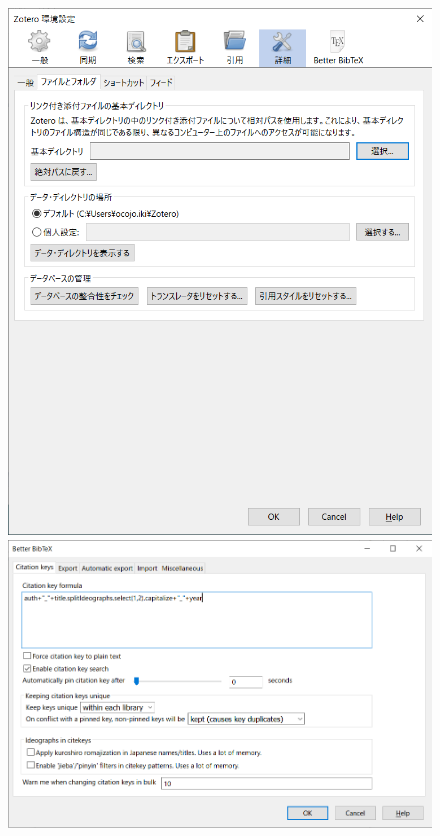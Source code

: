 \documentclass[a4paper,pdftex]{article}
\begin{document}
\begin{figure}[ht]
\begin{minipage}[ht]{0.19\columnwidth}
  \end{minipage}
  \begin{minipage}[ht]{0.19\columnwidth}
    \centering
    \includegraphics[width=\columnwidth]{fig/zotero08.png}
  \end{minipage}
  \begin{minipage}[ht]{0.19\columnwidth}
    \centering
    \includegraphics[width=\columnwidth]{fig/zotero09.png}

\end{minipage}
\end{figure}
\end{document}
